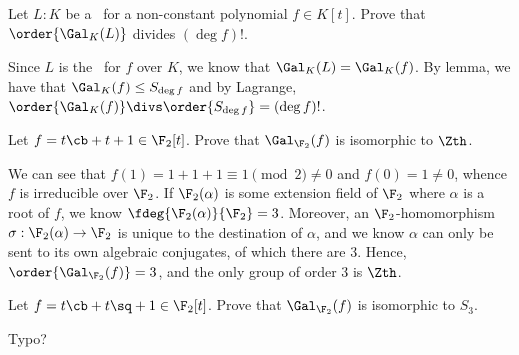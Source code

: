 \documentclass{article}
\begin{document}
\begin{exercise}
  Let \( L:K \) be a \sfe~for a non-constant polynomial \( f\in K[t] \).
  Prove that \( \order{\Gal_K(L)} \) divides \( (\deg f)! \).
\end{exercise}
\begin{solution}
  Since \( L \) is the \sfe~for \( f \) over \( K \), we know that \( \Gal_K(L) = \Gal_K(f) \).
  By lemma, we have that \( \Gal_K(f)\leq S_{\deg f} \) and by Lagrange, \( \order{\Gal_K(f)} \divs \order{S_{\deg f}}=(\deg f)! \).
\end{solution}

\begin{subexercise}
Let \( f = t\cb+t+1\in \F_2[t] \). Prove that \( \Gal_{\F_2}(f) \) is isomorphic to \( \Zth \).
\end{subexercise}
\begin{solution}
We can see that \( f(1) = 1 + 1 + 1 \equiv 1 \pmod 2 \neq 0 \) and \( f(0) = 1 \neq 0 \), whence \( f \) is irreducible over \( \F_2 \).
If \( \F_2(\alpha) \) is some extension field of \( \F_2 \) where \( \alpha \) is a root of \( f \), we know \( \fdeg{\F_2(\alpha)}{\F_2}=3 \).
Moreover, an \( \F_2 \)-homomorphism \( \sigma:\F_2(\alpha)\to \F_2 \) is unique to the destination of \( \alpha \), and we know \( \alpha \) can only be sent to its own algebraic conjugates, of which there are 3.
Hence, \( \order{\Gal_{\F_2}(f)}=3 \), and the only group of order 3 is \( \Zth \).
\end{solution}

\begin{subexercise}
Let \( f = t\cb+t\sq+1\in \F_2[t] \). Prove that \( \Gal_{\F_2}(f) \) is isomorphic to \( S_3 \).
\end{subexercise}
\begin{solution}
Typo?
\end{solution}
\end{document}

